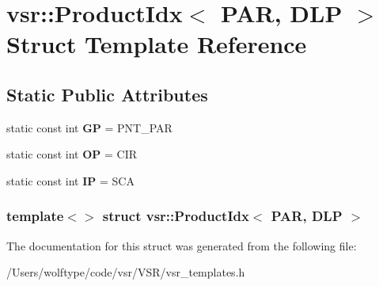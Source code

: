 \hypertarget{structvsr_1_1_product_idx_3_01_p_a_r_00_01_d_l_p_01_4}{\section{vsr\-:\-:Product\-Idx$<$ P\-A\-R, D\-L\-P $>$ Struct Template Reference}
\label{structvsr_1_1_product_idx_3_01_p_a_r_00_01_d_l_p_01_4}
}
\subsection*{Static Public Attributes}
\begin{DoxyCompactItemize}
\item 
\hypertarget{structvsr_1_1_product_idx_3_01_p_a_r_00_01_d_l_p_01_4_a1f904a082551b99dd76f836309a4d2f9}{static const int {\bfseries G\-P} = P\-N\-T\-\_\-\-P\-A\-R}\label{structvsr_1_1_product_idx_3_01_p_a_r_00_01_d_l_p_01_4_a1f904a082551b99dd76f836309a4d2f9}

\item 
\hypertarget{structvsr_1_1_product_idx_3_01_p_a_r_00_01_d_l_p_01_4_ab04fb261c942d3977edc27ae8fb4677b}{static const int {\bfseries O\-P} = C\-I\-R}\label{structvsr_1_1_product_idx_3_01_p_a_r_00_01_d_l_p_01_4_ab04fb261c942d3977edc27ae8fb4677b}

\item 
\hypertarget{structvsr_1_1_product_idx_3_01_p_a_r_00_01_d_l_p_01_4_aa2a38aedbc0a39c3a02a13c8b8e412c0}{static const int {\bfseries I\-P} = S\-C\-A}\label{structvsr_1_1_product_idx_3_01_p_a_r_00_01_d_l_p_01_4_aa2a38aedbc0a39c3a02a13c8b8e412c0}

\end{DoxyCompactItemize}
\subsubsection*{template$<$$>$ struct vsr\-::\-Product\-Idx$<$ P\-A\-R, D\-L\-P $>$}



The documentation for this struct was generated from the following file\-:\begin{DoxyCompactItemize}
\item 
/\-Users/wolftype/code/vsr/\-V\-S\-R/vsr\-\_\-templates.\-h\end{DoxyCompactItemize}
